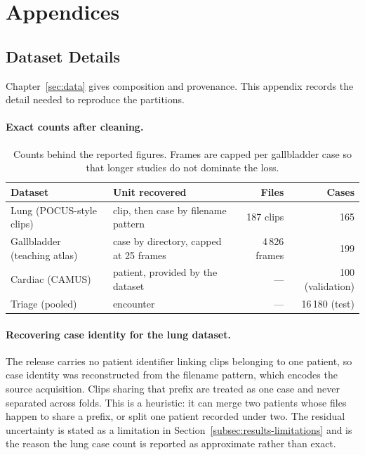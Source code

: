 \appendix
\renewcommand{\thesubsection}{\Alph{subsection}}
\setcounter{subsection}{0}

\section*{Appendices}

\subsection{Dataset Details}
\label{app:datasets}

Chapter~\ref{sec:data} gives composition and provenance. This appendix records the detail
needed to reproduce the partitions.

\paragraph{Exact counts after cleaning.}

\begin{table}[H]
  \centering
  \small
  \begin{tabularx}{\textwidth}{@{}lXrr@{}}
    \toprule
    Dataset & Unit recovered & Files & Cases \\
    \midrule
    Lung (POCUS-style clips) & clip, then case by filename pattern & 187 clips & 165 \\
    Gallbladder (teaching atlas) & case by directory, capped at 25 frames & 4\,826 frames & 199 \\
    Cardiac (CAMUS) & patient, provided by the dataset & --- & 100 (validation) \\
    Triage (pooled) & encounter & --- & 16\,180 (test) \\
    \bottomrule
  \end{tabularx}
  \caption{Counts behind the reported figures. Frames are capped per gallbladder case so that
    longer studies do not dominate the loss.}
  \label{tab:app-counts}
\end{table}

\paragraph{Recovering case identity for the lung dataset.} The release carries no patient
identifier linking clips belonging to one patient, so case identity was reconstructed from the
filename pattern, which encodes the source acquisition. Clips sharing that prefix are treated
as one case and never separated across folds. This is a heuristic: it can merge two patients
whose files happen to share a prefix, or split one patient recorded under two. The residual
uncertainty is stated as a limitation in Section~\ref{subsec:results-limitations} and is the
reason the lung case count is reported as approximate rather than exact.

